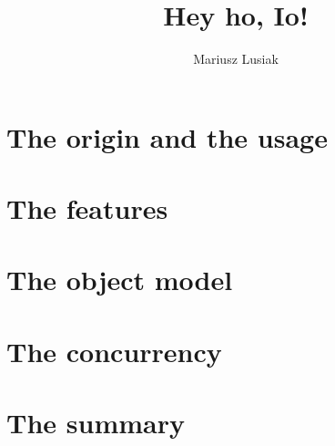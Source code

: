\documentclass{beamer}
\title[Io]{Hey ho, Io!}
\author{Mariusz Lusiak}
\institute{applicake.com}
\begin{document}
  
  \section{}
  
    \begin{frame}
      \titlepage
    \end{frame}
  
    \begin{frame}
      \tableofcontents[hideallsubsections]
    \end{frame}
  
  \section{The origin and the usage}
  
  
  \section{The features}
  
  
  \section{The object model}
  

  \section{The concurrency} %
  \label{sec:the_concurrency}
  

  \section{The summary} %
  \label{sec:the_summary}
  
\end{document}
